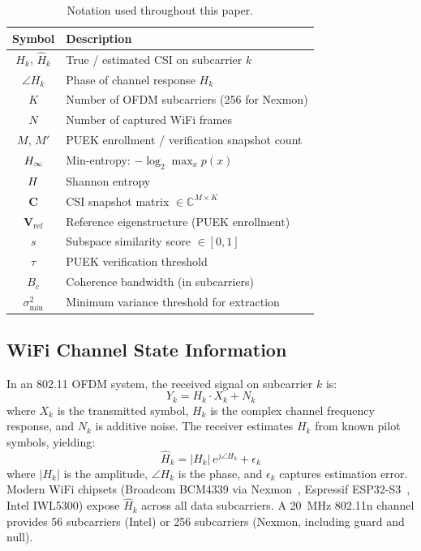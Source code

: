 \begin{table}[t]
\centering
\caption{Notation used throughout this paper.}
\label{tab:notation}
\small
\begin{tabular}{@{}cl@{}}
\toprule
\textbf{Symbol} & \textbf{Description} \\
\midrule
$H_k$, $\hat{H}_k$ & True / estimated CSI on subcarrier $k$ \\
$\angle H_k$ & Phase of channel response $H_k$ \\
$K$ & Number of OFDM subcarriers (256 for Nexmon) \\
$N$ & Number of captured WiFi frames \\
$M$, $M'$ & PUEK enrollment / verification snapshot count \\
$H_{\infty}$ & Min-entropy: $-\log_2 \max_x p(x)$ \\
$H$ & Shannon entropy \\
$\mathbf{C}$ & CSI snapshot matrix $\in \mathbb{C}^{M \times K}$ \\
$\mathbf{V}_{\mathrm{ref}}$ & Reference eigenstructure (PUEK enrollment) \\
$s$ & Subspace similarity score $\in [0,1]$ \\
$\tau$ & PUEK verification threshold \\
$B_c$ & Coherence bandwidth (in subcarriers) \\
$\sigma^2_{\min}$ & Minimum variance threshold for extraction \\
\bottomrule
\end{tabular}
\end{table}

\subsection{WiFi Channel State Information}
\label{subsec:csi-bg}

In an 802.11 OFDM system, the received signal on subcarrier $k$ is:
\begin{equation}
Y_k = H_k \cdot X_k + N_k
\label{eq:ofdm}
\end{equation}
where $X_k$ is the transmitted symbol, $H_k$ is the complex channel frequency response, and $N_k$ is additive noise.
The receiver estimates $H_k$ from known pilot symbols, yielding:
\begin{equation}
\hat{H}_k = |H_k| \, e^{j\angle H_k} + \epsilon_k
\label{eq:csi}
\end{equation}
where $|H_k|$ is the amplitude, $\angle H_k$ is the phase, and $\epsilon_k$ captures estimation error.
Modern WiFi chipsets (Broadcom BCM4339 via Nexmon~\cite{schulz2018nexmon}, Espressif ESP32-S3~\cite{espressif2023csi}, Intel IWL5300) expose $\hat{H}_k$ across all data subcarriers.
A 20~MHz 802.11n channel provides 56 subcarriers (Intel) or 256 subcarriers (Nexmon, including guard and null).

